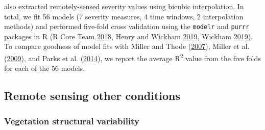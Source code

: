 \documentclass[twoside,12pt,final]{ucthesis-CA2012}
\begin{document}
\begin{ucmainmatter}
also extracted remotely-sensed severity values using bicubic
interpolation. In total, we fit 56 models (7 severity measures, 4 time
windows, 2 interpolation methods) and performed five-fold cross
validation using the \texttt{modelr} and \texttt{purrr} packages in R (R
Core Team \protect\hyperlink{ref-rcoreteam2018}{2018}, Henry and Wickham
\protect\hyperlink{ref-henry2019}{2019}, Wickham
\protect\hyperlink{ref-wickham2019}{2019}). To compare goodness of model
fits with Miller and Thode (\protect\hyperlink{ref-miller2007}{2007}),
Miller et al. (\protect\hyperlink{ref-miller2009a}{2009}), and Parks et
al. (\protect\hyperlink{ref-parks2014a}{2014}), we report the average
R\textsuperscript{2} value from the five folds for each of the 56
models.

\subsection{Remote sensing other
conditions}\label{remote-sensing-other-conditions}

\subsubsection{Vegetation structural
variability}\label{vegetation-structural-variability}


\end{ucmainmatter}
\end{document}
